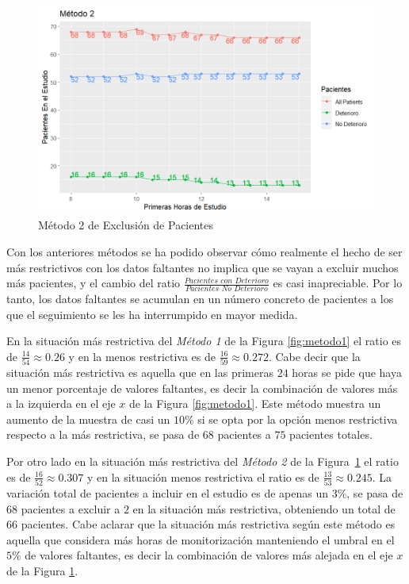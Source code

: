 \begin{figure}[H]
    \centering
    \includegraphics[scale = 1]{./img/metodo2.png}
    \caption{Método 2 de Exclusión de Pacientes}
    \label{fig:metodo2}
\end{figure}

Con los anteriores métodos se ha podido observar cómo realmente el hecho de ser más restrictivos con los datos faltantes no implica que se vayan a excluir muchos más pacientes, y el cambio del ratio $\frac{\textit{Pacientes con Deterioro}}{\textit{Pacientes No Deterioro}}$ es casi inapreciable. Por lo tanto, los datos faltantes se acumulan en un número concreto de pacientes a los que el seguimiento se les ha interrumpido en mayor medida.

En la situación más restrictiva del \textit{Método 1} de la Figura \ref{fig:metodo1} el ratio es de $ \frac{14}{54} \approx 0.26$ y en la menos restrictiva es de $ \frac{16}{59} \approx 0.272$. Cabe decir que la situación más restrictiva es aquella que en las primeras $24$ horas se pide que haya un menor porcentaje de valores faltantes, es decir la combinación de valores más a la izquierda en el eje $x$ de la Figura \ref{fig:metodo1}. Este método muestra un aumento de la muestra de casi un $10 \%$ si se opta por la opción menos restrictiva respecto a la más restrictiva, se pasa de $68$ pacientes a $75$ pacientes totales. 

Por otro lado en la situación más restrictiva del \textit{Método 2} de la Figura~\ref{fig:metodo2} el ratio es de $ \frac{16}{52} \approx 0.307$ y en la situación menos restrictiva el ratio es de $ \frac{13}{53} \approx 0.245$. La variación total de pacientes a incluir en el estudio es de apenas un $3 \%$, se pasa de $68$ pacientes a excluir a $2$ en la situación más restrictiva, obteniendo un total de $66$ pacientes. Cabe aclarar que la situación más restrictiva según este método es aquella que considera más horas de monitorización manteniendo el umbral en el $5 \%$ de valores faltantes, es decir la combinación de valores más alejada en el eje $x$ de la Figura \ref{fig:metodo2}.

